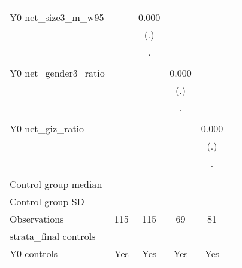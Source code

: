 \begin{table}[!h]
\begin{adjustbox}{width=\columnwidth,center}
\begin{tabular}{l*{5}{c}}
                    &                     &                     &                     &                     \\
Y0 net\_size3\_m\_w95  &                     &       0.000         &                     &                     \\
                    &                     &         (.)         &                     &                     \\
                    &                     &           .         &                     &                     \\
                    &                     &                     &                     &                     \\
Y0 net\_gender3\_ratio&                     &                     &       0.000         &                     \\
                    &                     &                     &         (.)         &                     \\
                    &                     &                     &           .         &                     \\
                    &                     &                     &                     &                     \\
Y0 net\_giz\_ratio    &                     &                     &                     &       0.000         \\
                    &                     &                     &                     &         (.)         \\
                    &                     &                     &                     &           .         \\
                    &                     &                     &                     &                     \\
\hline
Control group median&                     &                     &                     &                     \\
Control group SD    &                     &                     &                     &                     \\
Observations        &         115         &         115         &          69         &          81         \\
strata\_final controls&                     &                     &                     &                     \\
Y0 controls         &         Yes         &         Yes         &         Yes         &         Yes         \\

\end{tabular}
\end{adjustbox}
\end{table}
